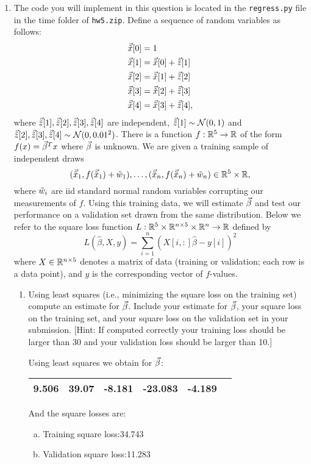 \documentclass[12pt,twoside]{article}
\begin{document}
\begin{enumerate}
\begin{enumerate}
 \end{enumerate}
 
\item The code you will implement in this question is located in the
  \verb|regress.py| file in the time folder of  \verb|hw5.zip|.
  Define a sequence of random variables as follows:
  \begin{align*}
    \vec{\tilde{ x }} [0] &= 1\\
    \vec{\tilde{ x }}[1] &= \vec{\tilde{ x }}[0]+\vec{\tilde{ z }}[1]\\
    \vec{\tilde{ x }}[2] &= \vec{\tilde{ x }}[1]+\vec{\tilde{ z }}[2]\\
    \vec{\tilde{ x }}[3] &= \vec{\tilde{ x }}[2]+\vec{\tilde{ z }}[3]\\
    \vec{\tilde{ x }}[4] &= \vec{\tilde{ x }}[3]+\vec{\tilde{ z }}[4],
  \end{align*}
  where $\vec{\tilde{ z }}[1],\vec{\tilde{ z }}[2],\vec{\tilde{ z }}[3],\vec{\tilde{ z }}[4]$ are independent,
  $\vec{\tilde{ z }}[1]\sim\operatorname{\mathcal{N}}(0,1)$ and
  $\vec{\tilde{ z }}[2],\vec{\tilde{ z }}[3],\vec{\tilde{ z }}[4]\sim\operatorname{\mathcal{N}}(0,0.01^2)$.  There is a function
  $f:\mathbb{R}^5\to\mathbb{R}$ of the form $f(x)=\vec{\beta}^Tx$ where $\vec{\beta}$ is
  unknown.  We are given a training sample of independent draws
  $$(\vec{\tilde{ x }}_1,f(\vec{\tilde{ x }}_1)+\tilde{ w }_1),\ldots,(\vec{\tilde{ x }}_n,f(\vec{\tilde{ x }}_n)+\tilde{ w }_n)\in\mathbb{R}^5\times\mathbb{R},$$
  where $\tilde{ w }_i$ are iid standard normal random variables corrupting
  our measurements of $f$.
  Using this training data, we will estimate $\vec{\beta}$ and test our
  performance on a validation set drawn from the same distribution.
  Below we refer to the square loss function
  $L:\mathbb{R}^5\times\mathbb{R}^{n\times 5}\times\mathbb{R}^n\to\mathbb{R}$ defined by
  $$L(\hat{\beta},X,y) = \sum_{i=1}^n (X[i,:]\hat{\beta}-y[i])^2$$
  where $X\in\mathbb{R}^{n\times 5}$ denotes a matrix of data (training or validation; each row
  is a data point), and $y$ is the corresponding vector of $f$-values.
  \begin{enumerate}
  \item Using least squares (i.e., minimizing the square loss on the
    training set) compute an estimate for $\vec{\beta}$.  Include your
    estimate for $\vec{\beta}$, your square loss on the training set, and
    your square loss on the validation set in your submission.
    [Hint: If computed correctly your training loss should be larger
      than 30 and your validation loss should be larger than 10.]
      
   Using least squares we obtain for $\vec{\beta}$:
   \begin{center}
    		\begin{tabular}{ | c | c | c | c | c | c | }
		\hline
			9.506 & 39.07 & -8.181 & -23.083 &  -4.189\\ 
		\hline
    	\end{tabular}
    \end{center}
    And the square losses are:
    \begin{enumerate}[(a)]
	\item Training square loss:34.743
	\item Validation square loss:11.283
    \end{enumerate}


\end{enumerate}
\end{enumerate}
\end{document}
